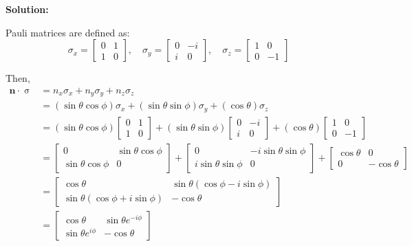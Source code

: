 \documentclass[11pt]{article}
\newenvironment{solution}
{\par\noindent\textbf{Solution:}\par}
{\vspace{1em}}
\begin{document}
\begin{solution}
Pauli matrices are defined as:\[\sigma_x = \begin{bmatrix}0 & 1 \\ 1 & 0\end{bmatrix}, \quad \sigma_y = \begin{bmatrix}0 & -i \\ i & 0\end{bmatrix}, \quad \sigma_z = \begin{bmatrix}1 & 0 \\ 0 & -1\end{bmatrix}\]

Then,
\[\begin{aligned}
\mathbf{n} \cdot \operatorname{\sigma} &= n_x\sigma_x + n_y\sigma_y + n_z\sigma_z \\
&= \left(\sin{\theta}\cos{\phi}\right)\sigma_x + \left(\sin{\theta}\sin{\phi}\right)\sigma_y + \left(\cos{\theta}\right)\sigma_z \\
&= \left(\sin{\theta}\cos{\phi}\right)\begin{bmatrix}0 & 1 \\ 1 & 0\end{bmatrix} + \left(\sin{\theta}\sin{\phi}\right)\begin{bmatrix}0 & -i \\ i & 0\end{bmatrix} + \left(\cos{\theta}\right)\begin{bmatrix}1 & 0 \\ 0 & -1\end{bmatrix} \\
&= \begin{bmatrix}0 & \sin{\theta}\cos{\phi} \\ \sin{\theta}\cos{\phi} & 0\end{bmatrix} + \begin{bmatrix}0 & -i\sin{\theta}\sin{\phi} \\ i\sin{\theta}\sin{\phi} & 0\end{bmatrix} + \begin{bmatrix}\cos{\theta} & 0 \\ 0 & -\cos{\theta}\end{bmatrix} \\
&= \begin{bmatrix}\cos{\theta} & \sin{\theta}\left(\cos{\phi} - i\sin{\phi}\right) \\ \sin{\theta}\left(\cos{\phi} + i\sin{\phi}\right) & -\cos{\theta}\end{bmatrix} \\
&= \begin{bmatrix}\cos{\theta} & \sin{\theta}e^{-i\phi} \\ \sin{\theta}e^{i\phi} & -\cos{\theta}\end{bmatrix}
\end{aligned}\]


\end{solution}
\end{document}
